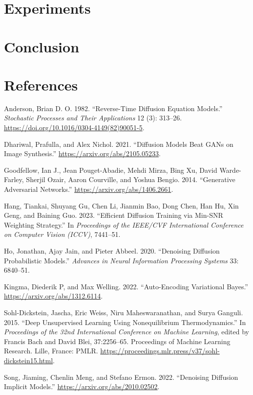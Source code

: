 \documentclass[
]{article}
\newlength{\cslhangindent}
\newenvironment{CSLReferences}[2] %
 {\begin{list}{}{%
  \setlength{\itemindent}{0pt}
  \setlength{\leftmargin}{0pt}
  \setlength{\parsep}{0pt}
  \ifodd #1
   \setlength{\leftmargin}{\cslhangindent}
   \setlength{\itemindent}{-1\cslhangindent}
  \fi
  \setlength{\itemsep}{#2\baselineskip}}}
 {\end{list}}
\theoremstyle{remark}
\begin{document}
\section{Experiments}\label{experiments}

\section{Conclusion}\label{conclusion}

\newpage{}

\section*{References}\label{references}

\label{refs}
\begin{CSLReferences}{1}{0}
Anderson, Brian D. O. 1982. {``Reverse-Time Diffusion Equation
Models.''} \emph{Stochastic Processes and Their Applications} 12 (3):
313--26. \url{https://doi.org/10.1016/0304-4149(82)90051-5}.

Dhariwal, Prafulla, and Alex Nichol. 2021. {``Diffusion Models Beat GANs
on Image Synthesis.''} \url{https://arxiv.org/abs/2105.05233}.

Goodfellow, Ian J., Jean Pouget-Abadie, Mehdi Mirza, Bing Xu, David
Warde-Farley, Sherjil Ozair, Aaron Courville, and Yoshua Bengio. 2014.
{``Generative Adversarial Networks.''}
\url{https://arxiv.org/abs/1406.2661}.

Hang, Tiankai, Shuyang Gu, Chen Li, Jianmin Bao, Dong Chen, Han Hu, Xin
Geng, and Baining Guo. 2023. {``Efficient Diffusion Training via Min-SNR
Weighting Strategy.''} In \emph{Proceedings of the IEEE/CVF
International Conference on Computer Vision (ICCV)}, 7441--51.

Ho, Jonathan, Ajay Jain, and Pieter Abbeel. 2020. {``Denoising Diffusion
Probabilistic Models.''} \emph{Advances in Neural Information Processing
Systems} 33: 6840--51.

Kingma, Diederik P, and Max Welling. 2022. {``Auto-Encoding Variational
Bayes.''} \url{https://arxiv.org/abs/1312.6114}.

Sohl-Dickstein, Jascha, Eric Weiss, Niru Maheswaranathan, and Surya
Ganguli. 2015. {``Deep Unsupervised Learning Using Nonequilibrium
Thermodynamics.''} In \emph{Proceedings of the 32nd International
Conference on Machine Learning}, edited by Francis Bach and David Blei,
37:2256--65. Proceedings of Machine Learning Research. Lille, France:
PMLR. \url{https://proceedings.mlr.press/v37/sohl-dickstein15.html}.

Song, Jiaming, Chenlin Meng, and Stefano Ermon. 2022. {``Denoising
Diffusion Implicit Models.''} \url{https://arxiv.org/abs/2010.02502}.

\end{CSLReferences}
\end{document}
